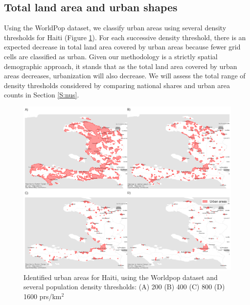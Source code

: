 \documentclass[review]{elsarticle}
\begin{document}
	\subsection{Total land area and urban shapes}
	\label{S:urban_shapes}
	
	Using the WorldPop dataset, we classify urban areas using several density thresholds for Haiti (Figure \ref{fig:hti_worldpop_explain_method}).
	For each successive density threshold, there is an expected decrease in total land area covered by urban areas because fewer grid cells are classified as urban.
	Given our methodology is a strictly spatial demographic approach, it stands that as the total land area covered by urban areas decreases, urbanization will also decrease.
	We will assess the total range of density thresholds considered by comparing national shares and urban area counts in Section \ref{S:nus}.
	
	\begin{figure}[H]
		\includegraphics[width=\textwidth]{density_thresholds_haiti}
		\caption{Identified urban areas for Haiti, using the Worldpop dataset and several population density thresholds: (A) 200 (B) 400 (C) 800 (D) 1600 prs/km$^2$}
		\label{fig:hti_worldpop_explain_method}
	\end{figure}
	
\end{document}
